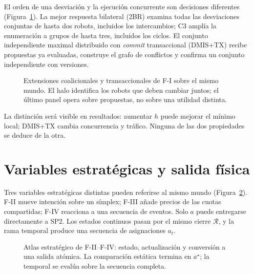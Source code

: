 El orden de una desviación y la ejecución concurrente son decisiones diferentes
(Figura~\ref{fig:n4-atlas-coalitional}). La mejor
respuesta bilateral (2BR) examina todas las desviaciones conjuntas de hasta dos
robots, incluidos los intercambios; C3 amplía la enumeración a grupos de hasta
tres, incluidos los ciclos. El conjunto independiente maximal distribuido con
\emph{commit} transaccional (DMIS+TX) recibe propuestas ya evaluadas, construye
el grafo de conflictos y confirma un conjunto independiente con versiones.

\begin{figure}[H]
\centering
\scalebox{.98}{}
\caption{Extensiones coalicionales y transaccionales de F-I sobre el mismo
mundo. El halo identifica los robots que deben cambiar juntos; el último panel
opera sobre propuestas, no sobre una utilidad distinta.}
\label{fig:n4-atlas-coalitional}
\viuownsource
\end{figure}

La distinción será visible en resultados: aumentar $h$ puede mejorar el mínimo
local; DMIS+TX cambia concurrencia y tráfico. Ninguna de las dos propiedades se
deduce de la otra.

\clearpage

\section*{Variables estratégicas y salida física}

Tres variables estratégicas distintas pueden referirse al mismo mundo
(Figura~\ref{fig:n4-atlas-continuous}). F-II mueve intención sobre un símplex; F-III
añade precios de las cuotas compartidas; F-IV reacciona a una secuencia de
eventos. Solo $a$ puede entregarse directamente a SP2. Los estados continuos
pasan por el mismo cierre $\mathcal R$, y la rama temporal produce una secuencia
de asignaciones $a_t$.

\begin{figure}[H]
\centering
\scalebox{.98}{}
\caption{Atlas estratégico de F-II--F-IV: estado, actualización y conversión a una
salida atómica. La comparación estática termina en $a^\star$; la temporal se
evalúa sobre la secuencia completa.}
\label{fig:n4-atlas-continuous}
\viuownsource
\end{figure}

